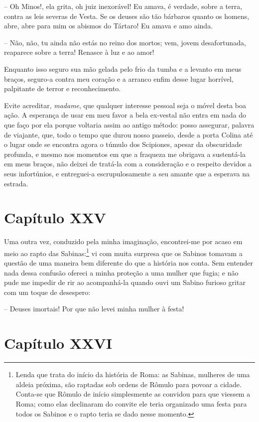 -- Oh Minos!, ela grita, oh juiz inexorável! Eu amava, é verdade,
sobre a terra, contra as leis severas de Vesta. Se os deuses são tão
bárbaros quanto os homens, abre, abre para mim os abismos do Tártaro!
Eu amava e amo ainda. 

-- Não, não, tu ainda não estás no reino dos mortos; vem, jovem
desafortunada, reaparece sobre a terra! Renasce à luz e ao amor! 

Enquanto isso seguro sua mão gelada pelo frio da tumba e a levanto em
meus braços, seguro-a contra meu coração e a arranco enfim desse lugar
horrível, palpitante de terror e reconhecimento. 

Evite acreditar, \textit{madame}, que qualquer interesse pessoal seja o
móvel desta boa ação. A esperança de usar em meu favor a bela ex-vestal
não entra em nada do que faço por ela porque voltaria assim ao antigo
método: posso assegurar, palavra de viajante, que, todo o tempo que
durou nosso passeio, desde a porta Colina até o lugar onde se encontra
agora o túmulo dos Scipiones, apesar da obscuridade profunda, e mesmo
nos momentos em que a fraqueza me obrigava a sustentá-la em meus
braços, não deixei de tratá-la com a consideração e o respeito devidos
a seus infortúnios, e entreguei-a escrupulosamente a seu amante que a
esperava na estrada.

\section{Capítulo XXV}

 Uma outra vez, conduzido pela minha imaginação, encontrei-me por acaso
em meio ao rapto das Sabinas:\footnote{ Lenda que trata do início da
história de Roma: as Sabinas, mulheres de uma aldeia próxima, são
raptadas sob ordens de Rômulo para povoar a cidade. Conta-se que Rômulo
de início simplesmente as convidou para que viessem a Roma; como elas
declinaram do convite ele teria organizado uma festa para todos os
Sabinos e o rapto teria se dado nesse momento.} vi com muita surpresa
que os Sabinos tomavam a questão de uma maneira bem diferente do que a
história nos conta. Sem entender nada dessa confusão ofereci a minha
proteção a uma mulher que fugia; e não pude me impedir de rir ao
acompanhá-la quando ouvi um Sabino furioso gritar com um toque de
desespero: 

 -- Deuses imortais! Por que não levei minha mulher à festa!

\section{Capítulo XXVI}

